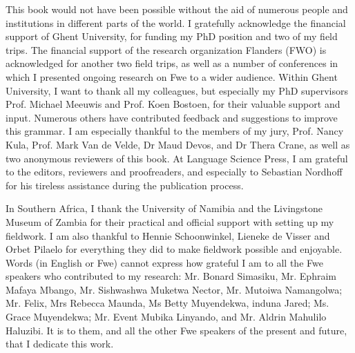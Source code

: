 \addchap{\lsAcknowledgementTitle} 

This book would not have been possible without the aid of numerous people and institutions in different parts of the world. I gratefully acknowledge the financial support of Ghent University, for funding my PhD position and two of my field trips. The financial support of the research organization Flanders (FWO) is acknowledged for another two field trips, as well as a number of conferences in which I presented ongoing research on Fwe to a wider audience. Within Ghent University, I want to thank all my colleagues, but especially my PhD supervisors Prof. Michael Meeuwis and Prof. Koen Bostoen, for their valuable support and input. Numerous others have contributed feedback and suggestions to improve this grammar. I am especially thankful to the members of my jury, Prof. Nancy Kula, Prof. Mark Van de Velde, Dr Maud Devos, and Dr Thera Crane, as well as two anonymous reviewers of this book. At Language Science Press, I am grateful to the editors, reviewers and proofreaders, and especially to Sebastian Nordhoff for his tireless assistance during the publication process.

In Southern Africa, I thank the University of Namibia and the Livingstone Museum of Zambia for their practical and official support with setting up my fieldwork. I am also thankful to Hennie Schoonwinkel, Lieneke de Visser and Orbet Pilaelo for everything they did to make fieldwork possible and enjoyable. Words (in English or Fwe) cannot express how grateful I am to all the Fwe speakers who contributed to my research: Mr. Bonard Simasiku, Mr. Ephraim Mafaya Mbango, Mr. Sishwashwa Muketwa Nector, Mr. Mutoiwa Namangolwa; Mr. Felix, Mrs Rebecca Maunda, Ms Betty Muyendekwa, induna Jared; Ms. Grace Muyendekwa; Mr. Event Mubika Linyando, and Mr. Aldrin Mahulilo Haluzibi. It is to them, and all the other Fwe speakers of the present and future, that I dedicate this work.

